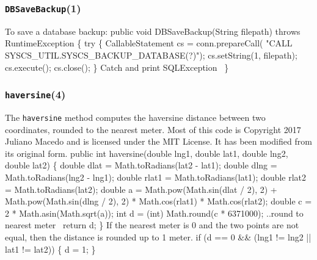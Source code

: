 \documentclass{article}
\def\nwendcode{\endtrivlist \endgroup}
\let\nwdocspar=\par
\theoremstyle{definition}
\begin{document}
\subsubsection{{\tt{}DBSaveBackup}(1)}
\label{sec:save-database-backup}
To save a database backup:
\nwenddocs{}\endmoddef{}
public void DBSaveBackup(String filepath) throws RuntimeException \{
  try \{
    CallableStatement cs = conn.prepareCall(
      "CALL SYSCS_UTIL.SYSCS_BACKUP_DATABASE(?)");
    cs.setString(1, filepath);
    cs.execute();
    cs.close();
  \}
  \LA{}Catch and print \code{}SQLException\edoc{}~{\nwtagstyle{}}\RA{}
\}
\nwendcode{}\nwdocspar
\subsubsection{{\tt{}\protect{}\protect{}haversine}(4)}
\label{sec:compute-haversine}
The {\tt{}\protect{}haversine} method computes the haversine distance between two
coordinates, rounded to the nearest meter.  Most of this code is Copyright 2017
Juliano Macedo and is licensed under the MIT License. It has been modified from
its original form.
\nwenddocs{}\endmoddef{}
public int haversine(double lng1, double lat1, double lng2, double lat2) \{
  double dlat = Math.toRadians(lat2 - lat1);
  double dlng = Math.toRadians(lng2 - lng1);
  double rlat1 = Math.toRadians(lat1);
  double rlat2 = Math.toRadians(lat2);
  double a = Math.pow(Math.sin(dlat / 2), 2)
    + Math.pow(Math.sin(dlng / 2), 2)
    * Math.cos(rlat1) * Math.cos(rlat2);
  double c = 2 * Math.asin(Math.sqrt(a));
  int d = (int) Math.round(c * 6371000);
  \LA{}..round to nearest meter~{\nwtagstyle{}}\RA{}
  return d;
\}
\eatline
{}\nwendcode{}If the nearest meter is 0 and the two points are not equal, then the distance
is rounded up to 1 meter.
\nwenddocs{}\endmoddef{}
if (d == 0 && (lng1 != lng2 || lat1 != lat2)) \{
  d = 1;
\}
\nwendcode{}\nwdocspar
\end{document}
